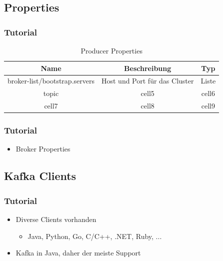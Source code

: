 \begin{frame}[fragile]
\subsection{Properties}
\frametitle{Tutorial}

\begin{table}[h!]
\centering
\begin{tabular}{ |c|c|c| } 
\hline 
Name & Beschreibung & Typ \\ \hline \hline
broker-list/bootstrap.servers & Host und Port für das Cluster & Liste \\ \hline
topic & cell5 & cell6 \\ 
cell7 & cell8 & cell9 \\ 
\hline
\end{tabular}
\caption{Producer Properties}
\label{producer_prop}
\end{table}

\end{frame}

\begin{frame}[fragile]
\frametitle{Tutorial}
\begin{itemize}
\item Broker Properties~\cite{KafkaPropBroker}
\end{itemize}
\end{frame}

\begin{frame}[fragile]
\subsection{Kafka Clients}
\frametitle{Tutorial}
\begin{itemize}
\item Diverse Clients vorhanden~\cite{KafkaClients}
\begin{itemize}
\item Java, Python, Go, C/C++, .NET, Ruby, ...
\end{itemize}
\item Kafka in Java, daher der meiste Support

\end{itemize}
\end{frame}

